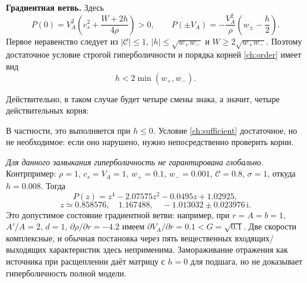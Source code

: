 \documentclass[11pt,a4paper]{article}
\newcommand{\VA}{V_A}
\begin{document}
\textbf{Градиентная ветвь.}
Здесь
\[
 P(0)=\VA^2\left(c_s^2+\frac{W+2h}{4\rho}\right)>0,
 \qquad
 P(\pm\VA)=-\frac{\VA^2}{\rho}\left(w_\pm-\frac h2\right).
\]
Первое неравенство следует из $|\mathcal C|\le1$,
$|h|\le\sqrt{w_+w_-}$ и $W\ge2\sqrt{w_+w_-}$.
Поэтому достаточное условие строгой гиперболичности и порядка корней
\eqref{ch:order} имеет вид
\begin{equation}
 h<2\min(w_+,w_-).
 \label{ch:sufficient}
\end{equation}

Действительно, в таком случае будет четыре смены знака, а значит, четыре действительных корня: 

\begin{center}
\end{center}

В частности, это выполняется при $h\le0$.
Условие \eqref{ch:sufficient} достаточное, но не необходимое:
если оно нарушено, нужно непосредственно проверить корни.

\emph{Для данного замыкания гиперболичность не гарантирована глобально.}
Контрпример: $\rho=1$, $c_s=\VA=1$, $w_+=0.1$, $w_-=0.001$,
$\mathcal C=0.8$, $\sigma=1$, откуда $h=0.008$.
Тогда
\[
 P(z)=z^4-2.07575z^2-0.0495z+1.02925,
\]
\[
 z\simeq0.858576,\quad1.167488,\quad-1.013032\pm0.023976\,\mathrm i.
\]
Это допустимое состояние градиентной ветви: например,
при $r=A=b=1$, $A'/A=2$, $d=1$, $\partial\rho/\partial r=-4.2$
имеем $\partial\VA/\partial r=0.1<G=\sqrt{0.1}$.
Две скорости комплексные, и обычная постановка через пять вещественных
входящих/выходящих характеристик здесь неприменима.
Замораживание отражения как источника при расщеплении даёт матрицу
с $h=0$ для подшага, но не доказывает гиперболичность полной модели.
\end{document}
